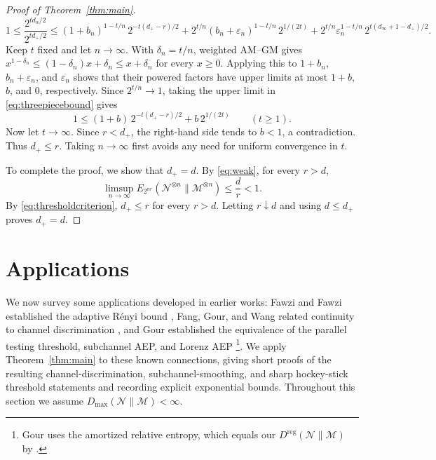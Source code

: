 \documentclass[11pt,letterpaper]{article}
\numberwithin{equation}{section}
\newcommand{\N}{\mathcal N}
\newcommand{\M}{\mathcal M}
\newcommand{\reg}{\mathrm{reg}}
\begin{document}
\begin{proof}[Proof of Theorem~\ref{thm:main}]
\begin{equation}
 1\le\frac{2^{td_\alpha/2}}{2^{td_+/2}}
 \le(1+b_n)^{1-t/n}\,2^{-t(d_+-r)/2}
 +2^{t/n}(b_n+\varepsilon_n)^{1-t/n}\,2^{1/(2t)}
 +2^{t/n}\varepsilon_n^{1-t/n}\,2^{t(d_\infty+1-d_+)/2}.
\end{equation}
Keep $t$ fixed and let $n\to\infty$. With $\delta_n=t/n$, weighted AM--GM gives $x^{1-\delta_n}\le(1-\delta_n)x+\delta_n\le x+\delta_n$ for every $x\ge0$. Applying this to $1+b_n$, $b_n+\varepsilon_n$, and $\varepsilon_n$ shows that their powered factors have upper limits at most $1+b$, $b$, and $0$, respectively. Since $2^{t/n}\to1$, taking the upper limit in \eqref{eq:threepiecebound} gives
\begin{equation}\label{eq:contradiction}
 1\le(1+b)\,2^{-t(d_+-r)/2}+b\,2^{1/(2t)}
 \qquad(t\ge1).
\end{equation}
Now let $t\to\infty$. Since $r<d_+$, the right-hand side tends to $b<1$, a contradiction. Thus $d_+\le r$. Taking $n\to\infty$ first avoids any need for uniform convergence in $t$.

To complete the proof, we show that $d_+=d$. By \eqref{eq:weak}, for every $r>d$,
\[
 \limsup_{n\to\infty}E_{2^{nr}}(\N^{\otimes n}\|\M^{\otimes n})
 \le\frac dr<1.
\]
By \eqref{eq:thresholdcriterion}, $d_+\le r$ for every $r>d$. Letting $r\downarrow d$ and using $d\le d_+$ proves $d_+=d$.
\end{proof}

\section{Applications}\label{sec:consequences}
We now survey some applications developed in earlier works: Fawzi and Fawzi established the adaptive R\'enyi bound \cite{FF}, Fang, Gour, and Wang related continuity to channel discrimination \cite{FGW}, and Gour established the equivalence of the parallel testing threshold, subchannel AEP, and Lorenz AEP \cite[Theorem 14]{Gour}\footnote{Gour uses the amortized relative entropy, which equals our $D^{\reg}(\N\|\M)$ by \cite[Corollary 3.7]{FFRS}.}. We apply Theorem~\ref{thm:main} to these known connections, giving short proofs of the resulting channel-discrimination, subchannel-smoothing, and sharp hockey-stick threshold statements and recording explicit exponential bounds. Throughout this section we assume $D_{\max}(\N\|\M)<\infty$.
\end{document}
